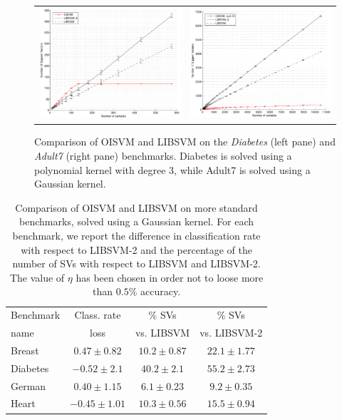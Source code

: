 \begin{figure}[!ht]
  \centering \footnotesize
  \begin{tabular}{cc}
  \includegraphics[width=0.47\linewidth]{figs/results/finite_kernel.pdf} &
  \includegraphics[width=0.47\linewidth]{figs/results/adult7.pdf}
  \end{tabular}
  \caption{Comparison of OISVM and LIBSVM on the \emph{Diabetes}
  (left pane) and \emph{Adult7} (right pane) benchmarks. Diabetes is
  solved using a polynomial kernel with degree $3$, while Adult7 is
  solved using a Gaussian kernel.}
\label{fig:ad7}
\end{figure}

\begin{table}
\begin{center}
\begin{tabular}[!h]{|l|c|c|c|}
\hline
  Benchmark & Class. rate    & \% SVs          & \% SVs        \\
       name & loss           & vs. LIBSVM      & vs. LIBSVM-2  \\ \hline
     Breast & $0.47\pm0.82$  & $10.2\pm0.87$   & $22.1\pm1.77$ \\
   Diabetes & $-0.52\pm2.1$  & $40.2\pm2.1$    & $55.2\pm2.73$ \\
   German   & $0.40\pm1.15$  & $6.1\pm0.23$    & $9.2\pm0.35$  \\
   Heart    & $-0.45\pm1.01$ & $10.3\pm0.56$   & $15.5\pm0.94$ \\ \hline
\end{tabular}
\end{center}
\label{table:t1}
\caption{Comparison of OISVM and LIBSVM on more standard benchmarks, solved
 using a Gaussian kernel. For each benchmark, we report the difference
 in classification rate with respect to LIBSVM-2 and the
 percentage of the number of SVs with respect to LIBSVM and
 LIBSVM-2. The value of $\eta$ has been chosen in order not to loose
 more than $0.5\%$ accuracy.}
\end{table}

